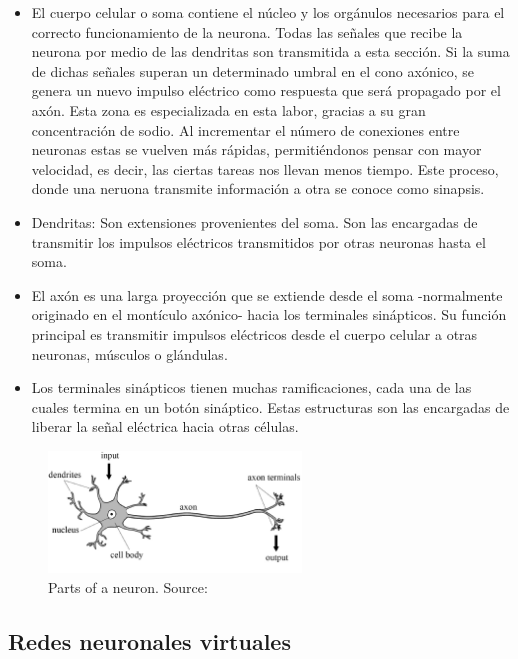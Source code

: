 \begin{itemize}
    \item El cuerpo celular o soma contiene el núcleo y los orgánulos necesarios para el correcto funcionamiento de la neurona. Todas las señales que recibe la neurona por medio de las dendritas son transmitida a esta sección. Si la suma de dichas señales superan un determinado umbral en el cono axónico,  se genera un nuevo impulso eléctrico como respuesta que será propagado por el axón. Esta zona es especializada en esta labor, gracias a su gran concentración de sodio. Al incrementar el número de conexiones entre neuronas estas se vuelven más rápidas, permitiéndonos pensar con mayor velocidad, es decir, las ciertas tareas nos llevan menos tiempo. Este proceso, donde una neruona transmite información a otra se conoce como sinapsis.
    \item Dendritas: Son extensiones provenientes del soma. Son las encargadas de transmitir los impulsos eléctricos transmitidos por otras neuronas hasta el soma.  
    \item El axón es una larga proyección que se extiende desde el soma -normalmente originado en el montículo axónico- hacia los terminales sinápticos. Su función principal es transmitir impulsos eléctricos desde el cuerpo celular a otras neuronas, músculos o glándulas.
    \item Los terminales sinápticos tienen muchas ramificaciones, cada una de las cuales termina en un botón sináptico. Estas estructuras son las encargadas de liberar la señal eléctrica hacia otras células.
\end{itemize}

\begin{figure}[h!]
    \centering
    \includegraphics[width=0.6\textwidth]{figures/neural_parts.png}
    \caption{Parts of a neuron. Source: \cite{partsNeuron}}
    \label{fig:neuron}
\end{figure}

\subsection{Redes neuronales virtuales}

